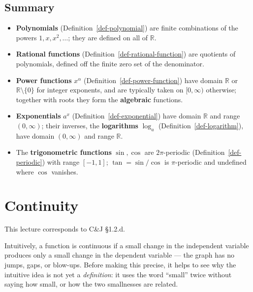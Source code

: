 \documentclass[
  letterpaper,
  DIV=11,
  numbers=noendperiod]{scrreprt}
\providecommand{\tightlist}{%
  \setlength{\itemsep}{0pt}\setlength{\parskip}{0pt}}
\theoremstyle{plain}
\theoremstyle{plain}
\theoremstyle{definition}
\theoremstyle{definition}
\theoremstyle{definition}
\theoremstyle{plain}
\theoremstyle{plain}
\theoremstyle{remark}
\begin{document}
\section{Summary}\label{summary-3}

\begin{itemize}
\tightlist
\item
  \textbf{Polynomials} (Definition~\ref{def-polynomial}) are finite
  combinations of the powers \(1,x,x^2,\dots\); they are defined on all
  of \(\mathbb{R}\).
\item
  \textbf{Rational functions} (Definition~\ref{def-rational-function})
  are quotients of polynomials, defined off the finite zero set of the
  denominator.
\item
  \textbf{Power functions} \(x^{\alpha}\)
  (Definition~\ref{def-power-function}) have domain \(\mathbb{R}\) or
  \(\mathbb{R}\setminus\{0\}\) for integer exponents, and are typically
  taken on \([0,\infty)\) otherwise; together with roots they form the
  \textbf{algebraic} functions.
\item
  \textbf{Exponentials} \(a^x\) (Definition~\ref{def-exponential}) have
  domain \(\mathbb{R}\) and range \((0,\infty)\); their inverses, the
  \textbf{logarithms} \(\log_a\) (Definition~\ref{def-logarithm}), have
  domain \((0,\infty)\) and range \(\mathbb{R}\).
\item
  The \textbf{trigonometric functions} \(\sin,\cos\) are
  \(2\pi\)-periodic (Definition~\ref{def-periodic}) with range
  \([-1,1]\); \(\tan = \sin/\cos\) is \(\pi\)-periodic and undefined
  where \(\cos\) vanishes.
\end{itemize}

\chapter{Continuity}\label{continuity}

\begin{tcolorbox}[enhanced jigsaw, arc=.35mm, bottomrule=.15mm, bottomtitle=1mm, breakable, colback=white, colbacktitle=quarto-callout-note-color!10!white, colframe=quarto-callout-note-color-frame, coltitle=black, left=2mm, leftrule=.75mm, opacityback=0, opacitybacktitle=0.6, rightrule=.15mm, title={Companion reading}, titlerule=0mm, toprule=.15mm, toptitle=1mm]

This lecture corresponds to C\&J §1.2.d.

\end{tcolorbox}

Intuitively, a function is continuous if a small change in the
independent variable produces only a small change in the dependent
variable --- the graph has no jumps, gaps, or blow-ups. Before making
this precise, it helps to see why the intuitive idea is not yet a
\emph{definition}: it uses the word ``small'' twice without saying how
small, or how the two smallnesses are related.
\end{document}
